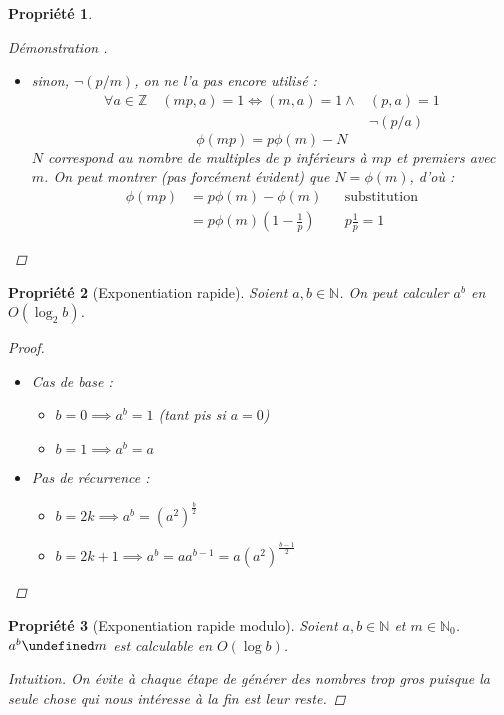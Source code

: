 \documentclass[11pt,twocolumn]{article}
\let\mod\undefined
\DeclareMathOperator{\mod}{mod}
\theoremstyle{plain}
\newtheorem{pr}{Propriété}
\newcommand{\esN}{\mathbb{N}} %
\newcommand{\esZ}{\mathbb{Z}} %
\newcommand{\dbi}{\Longleftrightarrow}
\newenvironment{cproof}[1]{\begin{proof}[Démonstration \cite{#1}]}{\end{proof}}
\begin{document}
\begin{pr}
\begin{cproof}{Buys}
\begin{itemize}
\begin{align*}
					&\dbi (m,a+km)=1
				\end{align*}
				\[
					[1;mp_i] = \bigcup_{k=0}^{p_i-1}[km+1;km+m]
				\]
				Dans chaque ensemble de cette partition,
				$\phi(m)$ éléments sont inférieurs et
				premiers avec $mp_i$ : \[
					\phi(mp_i)=p_i\phi(m)
				\]
			\item sinon, $\lnot(p/m)$, on ne l'a pas encore utilisé :
				\begin{align*}
					\forall a \in \esZ \quad (mp,a)=1
					\dbi (m,a)=1 \land& (p,a)=1 \\
					& \lnot(p/a)
				\end{align*}
				\[
					\phi(mp)=p\phi(m)-N
				\]
				$N$ correspond au nombre de multiples de $p$
				inférieurs à $mp$ et premiers avec $m$.
				On peut montrer (pas forcément évident) que $N=\phi(m)$, d'où :
				\begin{align*}
					\phi(mp) &= p\phi(m) - \phi(m) && \text{substitution} \\
					&= p\phi(m)\left(1-\frac1p\right) && p\frac1p=1
				\end{align*}
		\end{itemize}
	\end{cproof}
\end{pr}
\begin{pr}[Exponentiation rapide]\label{pr:fastexp}
	Soient $a,b \in \esN$.
	On peut calculer $a^b$ en $O(\log_2b)$.
	\begin{proof} ~
		\begin{itemize}
			\item Cas de base :
				\begin{itemize}
					\item $b=0 \implies a^b = 1$ (tant pis si $a=0$)
					\item $b=1 \implies a^b = a$
				\end{itemize}
			\item Pas de récurrence :
				\begin{itemize}
					\item $b=2k \implies a^b =
						\left(a^2\right)^\frac{b}2$
					\item $b=2k+1 \implies a^b =
						aa^{b-1}=a\left(a^2\right)^{\frac{b-1}2}$
				\end{itemize}
		\end{itemize}
	\end{proof}
\end{pr}
\begin{pr}[Exponentiation rapide modulo]
	Soient $a,b \in \esN$ et $m \in \esN_0$.
	$a^b \mod m$ est calculable en $O(\log b)$.
	\begin{proof}[Intuition]
		On évite à chaque étape de générer des nombres trop gros puisque
		la seule chose qui nous intéresse à la fin est leur reste.
	\end{proof}
\end{pr}
\end{document}
